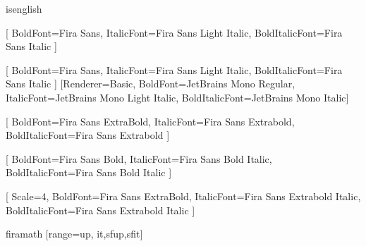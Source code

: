 \RequirePackage{microtype}
\RequirePackage{polyglossia}
\ifcsname isenglish\endcsname%
  \setdefaultlanguage{english}
\else
  \setdefaultlanguage{french}

\fi
\RequirePackage{fontspec}
\RequirePackage{amssymb}

[
  BoldFont={Fira Sans},
  ItalicFont={Fira Sans Light Italic},
  BoldItalicFont={Fira Sans Italic}
]

\setsansfont{Fira Sans Light}[
  BoldFont={Fira Sans},
  ItalicFont={Fira Sans Light Italic},
  BoldItalicFont={Fira Sans Italic}
]
\setmonofont{JetBrains Mono Light}[Renderer=Basic,
  BoldFont={JetBrains Mono Regular},
  ItalicFont={JetBrains Mono Light Italic},
  BoldItalicFont={JetBrains Mono Italic}]%

[
  BoldFont={Fira Sans ExtraBold},
  ItalicFont={Fira Sans Extrabold},
  BoldItalicFont={Fira Sans Extrabold}
]

[
  BoldFont={Fira Sans Bold},
  ItalicFont={Fira Sans Bold Italic},
  BoldItalicFont={Fira Sans Bold Italic}
]

[
  Scale=4,
  BoldFont={Fira Sans ExtraBold},
  ItalicFont={Fira Sans Extrabold Italic},
  BoldItalicFont={Fira Sans Extrabold Italic}
]

\ifcsname firamath\endcsname%
  \RequirePackage[math-style=french,bold-style=ISO]{unicode-math}
  [range={up, it,sfup,sfit}]
\fi

